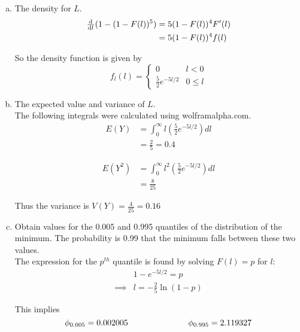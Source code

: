 \documentclass{scrartcl}
\begin{document}
\begin{enumerate}
\begin{enumerate}[a)]
  \item The density for $L$.\\

    \begin{align*}
      \od{}{l}(1 - (1 - F(l))^5) &= 5(1 - F(l))^4F'(l)\\
      &= 5(1 - F(l))^4f(l)\\
    \end{align*}

    So the density function is given by
    \begin{displaymath}
    f_l(l) = \begin{cases}
      0 & l < 0 \\
      \frac{5}{2}e^{-5l/2} & 0 \le l
    \end{cases}
    \end{displaymath}

  \item The expected value and variance of $L$.\\

    The following integrals were calculated using wolframalpha.com.
    \begin{align*}
      E(Y) &= \int_0^\infty l\left(\frac{5}{2}e^{-5l/2}\right) dl\\
      &= \frac{2}{5} = 0.4
    \end{align*}

    \begin{align*}
      E(Y^2) &= \int_0^\infty l^2\left(\frac{5}{2}e^{-5l/2}\right) dl\\
      &= \frac{8}{25}
    \end{align*}

    Thus the variance is $V(Y) = \frac{4}{25} = 0.16$

  \item Obtain values for the 0.005 and 0.995 quantiles of the distribution of the minimum. The probability is 0.99 that the minimum falls between these two values.\\

    The expression for the $p^{th}$ quantile is found by solving $F(l)=p$ for $l$:
    \begin{align*}
      &1 - e^{-5l/2} = p\\
      \implies&l = -\frac{2}{5}\ln(1 - p)
    \end{align*}
    
    This implies $$\phi_{0.005} = 0.002005 \text{\hspace{1in}} \phi_{0.995} = 2.119327$$
  \end{enumerate}
\end{enumerate}
\end{document}
